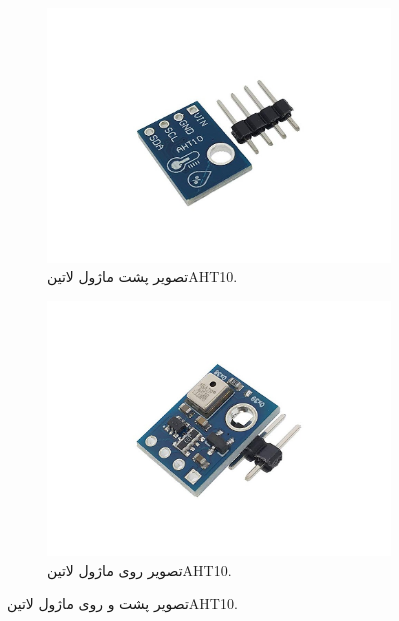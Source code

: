 \begin{figure}[H]
	\begin{subfigure}{0.5\linewidth}
		\includegraphics[width=\linewidth]{Assets/AHT10back.jpg}
		\caption{تصویر پشت ماژول ‌لاتین{AHT10}.}
		\label{fig:AHT10}
	\end{subfigure}
	\begin{subfigure}{0.5\linewidth}
		\includegraphics[width=\linewidth]{Assets/AHT10front.jpg}
		\caption{تصویر روی ماژول ‌لاتین{AHT10}.}
		\label{fig:AHT10}
	\end{subfigure}
	\caption{تصویر پشت و روی ماژول ‌لاتین{AHT10}.}
	\label{fig:AHT10}
\end{figure}

‌\label{sec:windSpeedANDAngle}

